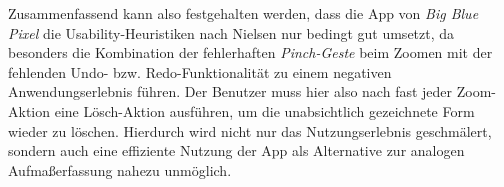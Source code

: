 Zusammenfassend kann also festgehalten werden, dass die App \pm{} von \emph{Big Blue Pixel} die Usability-Heuristiken nach Nielsen nur bedingt gut umsetzt, da besonders die Kombination der fehlerhaften \emph{Pinch-Geste} beim Zoomen mit der fehlenden Undo- bzw. Redo-Funktionalität zu einem negativen Anwendungserlebnis führen.
Der Benutzer muss hier also nach fast jeder Zoom-Aktion eine Lösch-Aktion ausführen, um die unabsichtlich gezeichnete Form wieder zu löschen.
Hierdurch wird nicht nur das Nutzungserlebnis geschmälert, sondern auch eine effiziente Nutzung der App als Alternative zur analogen Aufmaßerfassung nahezu unmöglich.
